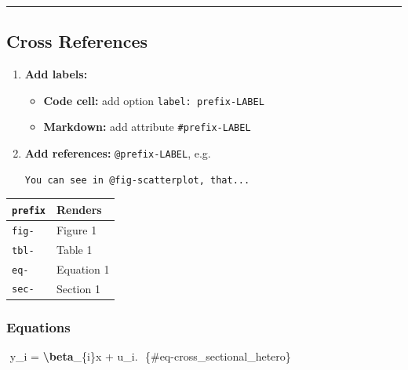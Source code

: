 \documentclass[
  a4paper,
  twoside,
  openright]{book}
\newenvironment{Shaded}{\begin{snugshade}}{\end{snugshade}}
\newcommand{\NormalTok}[1]{#1}
\newcommand{\SpecialCharTok}[1]{\textcolor[rgb]{0.81,0.36,0.00}{\textbf{#1}}}
\newcommand{\SpecialStringTok}[1]{\textcolor[rgb]{0.31,0.60,0.02}{#1}}
\providecommand{\tightlist}{%
  \setlength{\itemsep}{0pt}\setlength{\parskip}{0pt}}
\theoremstyle{definition}
\theoremstyle{definition}
\theoremstyle{definition}
\theoremstyle{definition}
\theoremstyle{remark}
\begin{document}
\begin{center}\rule{0.5\linewidth}{0.5pt}\end{center}

\subsection{Cross References}\label{cross-references-1}

\begin{enumerate}
\def\labelenumi{\arabic{enumi}.}
\item
  \textbf{Add labels:}

  \begin{itemize}
  \tightlist
  \item
    \textbf{Code cell:} add option \texttt{label:\ prefix-LABEL}
  \item
    \textbf{Markdown:} add attribute \texttt{\#prefix-LABEL}
  \end{itemize}
\item
  \textbf{Add references:} \texttt{@prefix-LABEL}, e.g.

\begin{verbatim}
You can see in @fig-scatterplot, that...
\end{verbatim}
\end{enumerate}

\begin{longtable}[]{@{}ll@{}}
\toprule\noalign{}
\texttt{prefix} & Renders \\
\midrule\noalign{}
\endhead
\bottomrule\noalign{}
\endlastfoot
\texttt{fig-} & Figure 1 \\
\texttt{tbl-} & Table 1 \\
\texttt{eq-} & Equation 1 \\
\texttt{sec-} & Section 1 \\
\end{longtable}

\subsubsection*{Equations}\label{equations-1}

\begin{Shaded}
\begin{Highlighting}[]
\SpecialStringTok{$$}
\SpecialStringTok{y\_i = }\SpecialCharTok{\textbackslash{}beta}\SpecialStringTok{\_\{i\}\textquotesingle{}x + u\_i.}
\SpecialStringTok{$$}\NormalTok{ \{\#eq{-}cross\_sectional\_hetero\}}
\end{Highlighting}
\end{Shaded}
\end{document}
